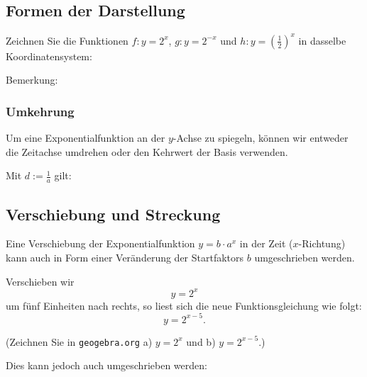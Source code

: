 \subsection{Formen der Darstellung}
Zeichnen Sie die Funktionen $f: y=2^x$, $g: y=2^{-x}$ und $h: y=\left(\frac12\right)^x$ in dasselbe Koordinatensystem:


Bemerkung: 
\newpage



\subsubsection{Umkehrung}
Um eine Exponentialfunktion an der $y$-Achse zu spiegeln, können wir entweder
die Zeitachse umdrehen oder den Kehrwert der Basis verwenden.

Mit $d := \frac1a $ gilt:

\begin{center}
\end{center}

\newpage

\newpage

\subsection{Verschiebung und Streckung }

Eine Verschiebung der Exponentialfunktion $y=b\cdot{}a^x$ in der Zeit ($x$-Richtung) kann auch in Form einer Veränderung der Startfaktors $b$ umgeschrieben werden.

Verschieben wir \zB $$y=2^x$$ um fünf Einheiten nach rechts, so liest sich die neue Funktionsgleichung wie folgt:
$$y=2^{x-5}.$$

(Zeichnen Sie in \texttt{geogebra.org} a) $y=2^x$ und b) $y=2^{x-5}$.)

Dies kann jedoch auch umgeschrieben werden:




